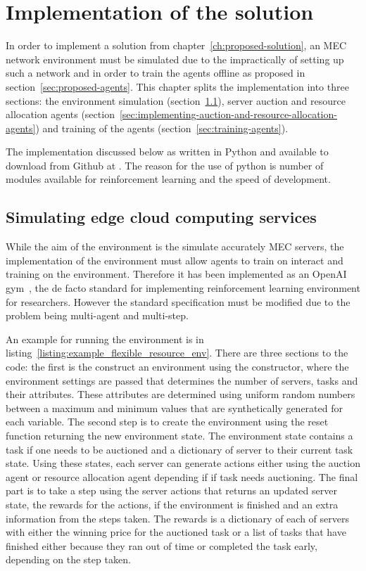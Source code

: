 \chapter{Implementation of the solution}\label{ch:implementation-of-the-solution}
In order to implement a solution from chapter~\ref{ch:proposed-solution}, an MEC network environment
must be simulated due to the impractically of setting up such a network and in order to train the agents offline as proposed
in section~\ref{sec:proposed-agents}. This chapter splits the implementation into three sections: the environment
simulation (section~\ref{sec:simulating-edge-cloud-computing-services}), server auction and resource
allocation agents (section~\ref{sec:implementing-auction-and-resource-allocation-agents}) and training of the
agents (section~\ref{sec:training-agents}).

The implementation discussed below as written in Python and available to download from Github at
. The reason for the use of python is number
of modules available for reinforcement learning and the speed of development.

\section{Simulating edge cloud computing services}\label{sec:simulating-edge-cloud-computing-services}
While the aim of the environment is the simulate accurately MEC servers, the implementation of the
environment must allow agents to train on interact and training on the environment. Therefore it has been implemented
 as an OpenAI gym~\citep{openaigym}, the de facto standard for implementing reinforcement learning
environment for researchers. However the standard specification must be modified due to the problem being multi-agent
and multi-step.

An example for running the environment is in listing~\ref{listing:example_flexible_resource_env}. There are three
sections to the code: the first is the construct an environment using the constructor, where the environment settings
are passed that determines the number of servers, tasks and their attributes. These attributes are determined using
uniform random numbers between a maximum and minimum values that are synthetically generated for each variable. The
second step is to create the environment using the reset function returning the new environment state. The environment
state contains a task if one needs to be auctioned and a dictionary of server to their current task state. Using these
states, each server can generate actions either
using the auction agent or resource allocation agent depending if if task needs auctioning. The final part is to
take a step using the server actions that returns an updated server state, the rewards for the actions,
if the environment is finished and an extra information from the steps taken. The rewards is a dictionary of each of
servers with either the winning price for the auctioned task or a list of tasks that have finished either because
they ran out of time or completed the task early, depending on the step taken.

